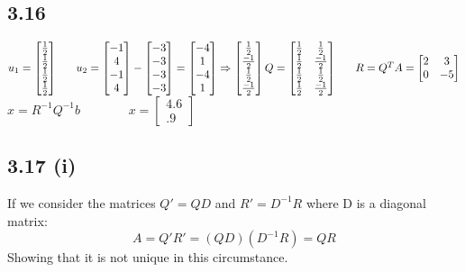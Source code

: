 \documentclass[letterpaper,12pt]{article}
\theoremstyle{definition}
\begin{document}
\subsection*{3.16}
$u_1 = \begin{bmatrix}
\frac{1}{2}\\
\frac{1}{2}\\
\frac{1}{2}\\
\frac{1}{2}\\
\end{bmatrix}~~~~~
u_2 = \begin{bmatrix}
-1\\
4\\
-1\\
4
\end{bmatrix} - \begin{bmatrix}
-3\\
-3\\
-3\\
-3
\end{bmatrix} = \begin{bmatrix}
-4\\
1\\
-4\\
1
\end{bmatrix}\Rightarrow \begin{bmatrix}
\frac{1}{2}\\
\frac{-1}{2}\\
\frac{1}{2}\\
\frac{-1}{2}\\
\end{bmatrix}\\
Q = \begin{bmatrix}
\frac{1}{2}&\frac{1}{2}\\
\frac{1}{2}&\frac{-1}{2}\\
\frac{1}{2}&\frac{1}{2}\\
\frac{1}{2}&\frac{-1}{2}\\
\end{bmatrix} ~~~~~
R = Q^TA = \begin{bmatrix}
2 & 3\\
0 & -5\\
\end{bmatrix}
$\\
$x = R^{-1}Q^{-1}b$
~~~~~~~$x = \begin{bmatrix}
4.6\\
.9
\end{bmatrix}$

\subsection*{3.17 (i)}
If we consider the matrices $Q'=QD$ and $R'= D^{-1}R$ where D is a diagonal matrix:
\[ A = Q'R' = (QD)(D^{-1}R) = QR  \]
Showing that it is not unique in this circumstance. \\ 
\end{document}
